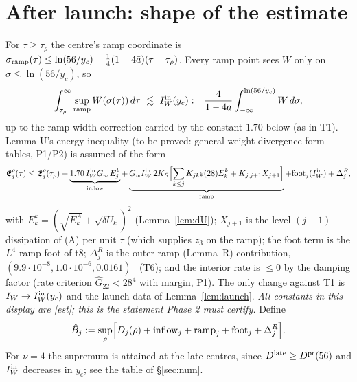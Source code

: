 \documentclass[11pt]{article}
\theoremstyle{remark}\newtheorem{remark}[theorem]{Remark}
\newcommand{\E}{\mathfrak E}
\begin{document}
\section{After launch: shape of the estimate}\label{sec:evol}
For $\tau\ge\tau_\rho$ the centre's ramp coordinate is $\sigma_{\rm ramp}(\tau)\le\ln(56/y_c)-\frac14(1-4\bar a)(\tau-\tau_\rho)$. Every ramp point sees $W$ only on $\sigma\le\ln(56/y_c)$, so
\[
\int_{\tau_\rho}^\infty\sup_{\rm ramp}W(\sigma(\tau))\,d\tau\ \lesssim\ I_W^{\rm in}(y_c):=\frac4{1-4\bar a}\int_{-\infty}^{\ln(56/y_c)}W\,d\sigma ,
\]
up to the ramp-width correction carried by the constant $1.70$ below (as in T1). Lemma U's energy inequality (to be proved: general-weight divergence-form tables, P1/P2) is assumed of the form
\[
\E_j^\rho(\tau)\le\E_j^\rho(\tau_\rho)+\underbrace{1.70\,I_W^{\rm in}G_w\,E^k_j}_{\rm inflow}+\underbrace{G_wI_W^{\rm in}\,2K_S\Bigl[\sum_{k\le j}K_{jk}\varepsilon(28)E^k_k+K_{j,j+1}X_{j+1}\Bigr]}_{\rm ramp}+{\rm foot}_j(I_W^{\rm in})+\Delta^{R}_j ,
\]
with $E^k_k=(\sqrt{E^A_k}+\sqrt{\delta U_k})^2$ (Lemma~\ref{lem:dU}); $X_{j+1}$ is the level-$(j{-}1)$ dissipation of (A) per unit $\tau$ (which supplies $z_3$ on the ramp); the foot term is the $L^4$ ramp foot of t8; $\Delta^R_j$ is the outer-ramp (Lemma~R) contribution, $(9.9\cdot10^{-8},1.0\cdot10^{-6},0.0161)$ \tE\ (T6); and the interior rate is $\le0$ by the damping factor (rate criterion $\hat G_{22}<28^4$ with margin, P1). The only change against T1 is $I_W\to I_W^{\rm in}(y_c)$ and the launch data of Lemma~\ref{lem:launch}. \emph{All constants in this display are [est]; this is the statement Phase 2 must certify.} Define
\[
\hat B_j:=\sup_{\rho}\Bigl[D_j(\rho)+{\rm inflow}_j+{\rm ramp}_j+{\rm foot}_j+\Delta^R_j\Bigr].
\]
For $\nu=4$ the supremum is attained at the late centres, since $D^{\rm late}\ge D^{\rm pr}(56)$ and $I_W^{\rm in}$ decreases in $y_c$; see the table of \S\ref{sec:num}.
\end{document}
